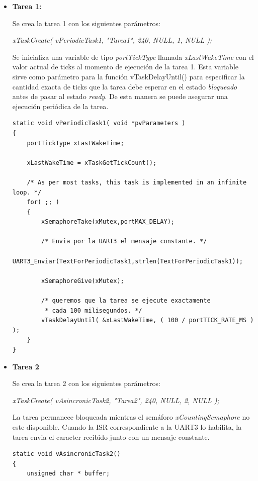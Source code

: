 \documentclass[a4paper,12pt]{article}
\begin{document}
\begin{itemize}

\item {\textbf{Tarea 1:}}

Se crea la tarea 1 con los siguientes parámetros:

\begin{center}
\textit{xTaskCreate( vPeriodicTask1, "Tarea1", 240, NULL, 1, NULL );}
\end{center}

Se inicializa una variable de tipo \textit{portTickType} llamada \textit{xLastWakeTime} con el valor actual de ticks al momento de ejecución de la tarea 1.  Esta variable sirve como parámetro para la función vTaskDelayUntil() para especificar la cantidad exacta de ticks que la tarea debe esperar en el estado \textit{bloqueado} antes de pasar al estado \textit{ready}.  De esta manera se puede asegurar una ejecución periódica de la tarea.

\begin{verbatim}
static void vPeriodicTask1( void *pvParameters )
{
	portTickType xLastWakeTime;
	
	xLastWakeTime = xTaskGetTickCount();

	/* As per most tasks, this task is implemented in an infinite loop. */
	for( ;; )
	{
		xSemaphoreTake(xMutex,portMAX_DELAY);

		/* Envia por la UART3 el mensaje constante. */
		UART3_Enviar(TextForPeriodicTask1,strlen(TextForPeriodicTask1));

		xSemaphoreGive(xMutex);
		
		/* queremos que la tarea se ejecute exactamente 
		 * cada 100 milisegundos. */
		vTaskDelayUntil( &xLastWakeTime, ( 100 / portTICK_RATE_MS ) );
	}
}
\end{verbatim} 

\item {\textbf{Tarea 2}}

Se crea la tarea 2 con los siguientes parámetros:

\begin{center}
\textit{xTaskCreate( vAsincronicTask2, "Tarea2", 240, NULL, 2, NULL );}
\end{center}

La tarea permanece bloqueada mientras el semáforo {\textit{xCountingSemaphore}} no este disponible. Cuando la ISR correspondiente a la UART3 lo habilita, la tarea envia el caracter recibido junto con un mensaje constante.

\begin{verbatim}
static void vAsincronicTask2()
{
	unsigned char * buffer;


\end{verbatim}
\end{itemize}
\end{document}
